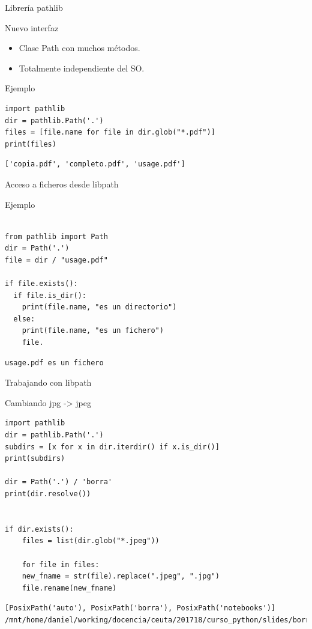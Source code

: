 \documentclass[bigger,unknownkeysallowed]{beamer}
\begin{document}
\begin{frame}[fragile,label={sec:orgf63eb48}]{Librería pathlib}
 \begin{block}{Nuevo interfaz}
\begin{itemize}
\item Clase Path con muchos métodos.

\item Totalmente independiente del SO.
\end{itemize}
\end{block}

\begin{block}{Ejemplo}
\begin{verbatim}
import pathlib
dir = pathlib.Path('.')
files = [file.name for file in dir.glob("*.pdf")]
print(files)
\end{verbatim}
\scriptsize
\begin{verbatim}
['copia.pdf', 'completo.pdf', 'usage.pdf']
\end{verbatim}
\end{block}
\end{frame}

\begin{frame}[fragile,label={sec:org00a9aba}]{Acceso a ficheros desde libpath}
 \begin{block}{Ejemplo}
\begin{verbatim}

from pathlib import Path
dir = Path('.')
file = dir / "usage.pdf"

if file.exists():
  if file.is_dir():
    print(file.name, "es un directorio")
  else:
    print(file.name, "es un fichero")
    file.
\end{verbatim}
\scriptsize
\begin{verbatim}
usage.pdf es un fichero
\end{verbatim}
\end{block}
\end{frame}

\begin{frame}[fragile,label={sec:orgd06b5e3}]{Trabajando con libpath}
 \begin{block}{Cambiando jpg -> jpeg}
\begin{verbatim}
import pathlib
dir = pathlib.Path('.')
subdirs = [x for x in dir.iterdir() if x.is_dir()]
print(subdirs)

dir = Path('.') / 'borra'
print(dir.resolve())


if dir.exists():
    files = list(dir.glob("*.jpeg"))

    for file in files:
	new_fname = str(file).replace(".jpeg", ".jpg")
	file.rename(new_fname)
\end{verbatim}
\scriptsize
\begin{verbatim}
[PosixPath('auto'), PosixPath('borra'), PosixPath('notebooks')]
/mnt/home/daniel/working/docencia/ceuta/201718/curso_python/slides/borra
\end{verbatim}
\end{block}
\end{frame}
\end{document}
